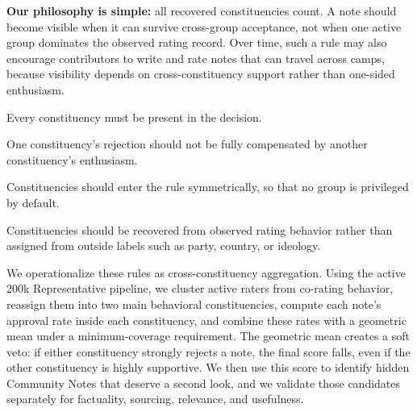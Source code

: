 \documentclass[10pt,twocolumn]{article}
\begin{document}
\begin{tcolorbox}[title=Philosophy, fonttitle=\bfseries,
    coltitle=black, colbacktitle=green!20, colback=green!6,
    colframe=green!45!black, boxrule=0.6pt, arc=2pt,
    left=6pt, right=6pt, top=5pt, bottom=5pt]
\textbf{Our philosophy is simple:} all recovered constituencies count. A note
should become visible when it can survive cross-group acceptance, not when one
active group dominates the observed rating record. Over time, such a rule may
also encourage contributors to write and rate notes that can travel across
camps, because visibility depends on cross-constituency support rather than
one-sided enthusiasm.
\end{tcolorbox}

\begin{tcolorbox}[title=Principles, fonttitle=\bfseries,
    coltitle=black, colbacktitle=green!20, colback=green!6,
    colframe=green!45!black, boxrule=0.6pt, arc=2pt,
    left=6pt, right=6pt, top=5pt, bottom=5pt]
\begin{description}[leftmargin=0pt,labelsep=0.6em,itemsep=0.25em]
    \item[\textbf{\emph{P1. Presence.}}] Every constituency must be present in the
    decision.
    \item[\textbf{\emph{P2. Non-compensation.}}] One constituency's rejection should
    not be fully compensated by another constituency's enthusiasm.
    \item[\textbf{\emph{P3. Symmetry.}}] Constituencies should enter the rule
    symmetrically, so that no group is privileged by default.
    \item[\textbf{\emph{P4. Behavioral recovery.}}] Constituencies should be
    recovered from observed rating behavior rather than assigned from outside
    labels such as party, country, or ideology.
\end{description}
\end{tcolorbox}

\medskip

We operationalize these rules as cross-constituency aggregation. Using the
active 200k Representative pipeline, we cluster active raters from co-rating
behavior, reassign them into two main behavioral constituencies, compute each
note's approval rate inside each constituency, and combine these rates with a
geometric mean under a minimum-coverage requirement. The geometric mean creates
a soft veto: if either constituency strongly rejects a note, the final score
falls, even if the other constituency is highly supportive. We then use this
score to identify hidden Community Notes that deserve a second look, and we
validate those candidates separately for factuality, sourcing, relevance, and
usefulness.
\end{document}
